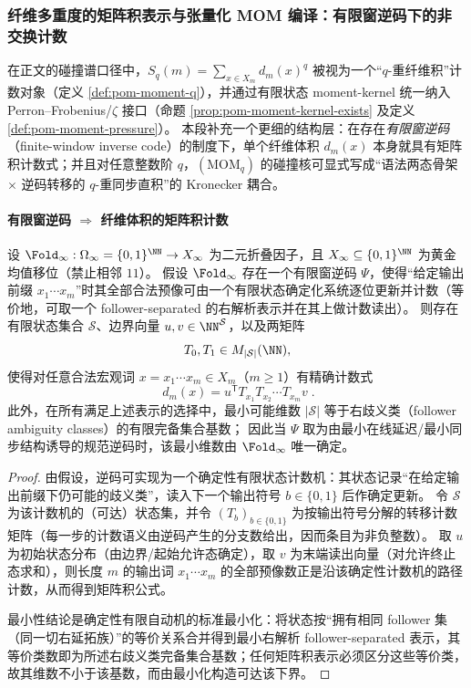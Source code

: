 \subsubsection{纤维多重度的矩阵积表示与张量化 MOM 编译：有限窗逆码下的非交换计数}\label{subsubsec:pom-multiplicity-matrix-product-tensor-mom}
在正文的碰撞谱口径中，\(S_q(m)=\sum_{x\in X_m}d_m(x)^q\) 被视为一个“\(q\)-重纤维积”计数对象（定义 \ref{def:pom-moment-q}），并通过有限状态 moment-kernel 统一纳入 Perron--Frobenius/\(\zeta\) 接口（命题 \ref{prop:pom-moment-kernel-exists} 及定义 \ref{def:pom-moment-pressure}）。
本段补充一个更细的结构层：在存在\emph{有限窗逆码}（finite-window inverse code）的制度下，单个纤维体积 \(d_m(x)\) 本身就具有矩阵积计数式；并且对任意整数阶 \(q\)，\((\mathrm{MOM}_q)\) 的碰撞核可显式写成“语法两态骨架 \(\times\) 逆码转移的 \(q\)-重同步直积”的 Kronecker 耦合。

\paragraph{有限窗逆码 \texorpdfstring{$\Rightarrow$}{=>} 纤维体积的矩阵积计数}
\begin{theorem}[纤维多重度的矩阵积表示与最小歧义态维数]\label{thm:pom-fiber-multiplicity-matrix-product}
设 \(\Fold_\infty:\Omega_\infty=\{0,1\}^{\NN}\to X_\infty\) 为二元折叠因子，且 \(X_\infty\subseteq\{0,1\}^{\NN}\) 为黄金均值移位（禁止相邻 \(11\)）。
假设 \(\Fold_\infty\) 存在一个有限窗逆码 \(\Psi\)，使得“给定输出前缀 \(x_1\cdots x_m\)”时其全部合法预像可由一个有限状态确定化系统逐位更新并计数（等价地，可取一个 follower-separated 的右解析表示并在其上做计数读出）。
则存在有限状态集合 \(\mathcal S\)、边界向量 \(u,v\in\NN^{\mathcal S}\)，以及两矩阵
\[
T_0,T_1\in M_{|\mathcal S|}(\NN),
\]
使得对任意合法宏观词 \(x=x_1\cdots x_m\in X_m\)（\(m\ge 1\)）有精确计数式
\[
\boxed{\;
d_m(x)=u^{\mathsf T}T_{x_1}T_{x_2}\cdots T_{x_m}v\; }.
\]
此外，在所有满足上述表示的选择中，最小可能维数 \(|\mathcal S|\) 等于右歧义类（follower ambiguity classes）的有限完备集合基数；
因此当 \(\Psi\) 取为由最小在线延迟/最小同步结构诱导的规范逆码时，该最小维数由 \(\Fold_\infty\) 唯一确定。
\end{theorem}
\begin{proof}
由假设，逆码可实现为一个确定性有限状态计数机：其状态记录“在给定输出前缀下仍可能的歧义类”，读入下一个输出符号 \(b\in\{0,1\}\) 后作确定更新。
令 \(\mathcal S\) 为该计数机的（可达）状态集，并令 \((T_b)_{b\in\{0,1\}}\) 为按输出符号分解的转移计数矩阵（每一步的计数语义由逆码产生的分支数给出，因而条目为非负整数）。
取 \(u\) 为初始状态分布（由边界/起始允许态确定），取 \(v\) 为末端读出向量（对允许终止态求和），则长度 \(m\) 的输出词 \(x_1\cdots x_m\) 的全部预像数正是沿该确定性计数机的路径计数，从而得到矩阵积公式。
\par
最小性结论是确定性有限自动机的标准最小化：将状态按“拥有相同 follower 集（同一切右延拓族）”的等价关系合并得到最小右解析 follower-separated 表示，其等价类数即为所述右歧义类完备集合基数；任何矩阵积表示必须区分这些等价类，故其维数不小于该基数，而由最小化构造可达该下界。
\end{proof}

